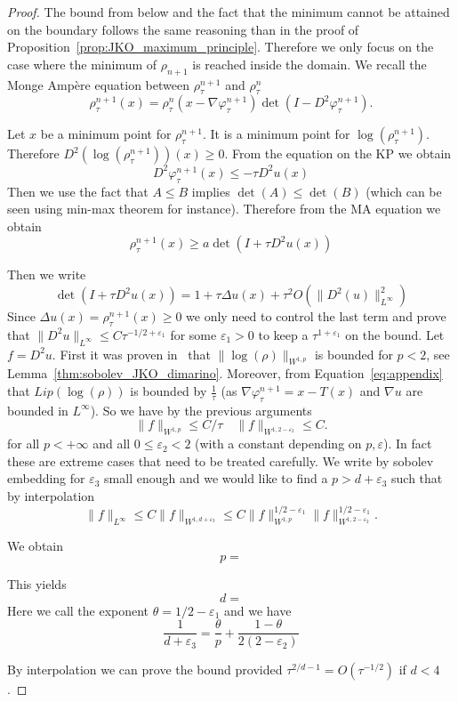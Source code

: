 \documentclass[a4paper,twosided, 11pt]{article}
\newcommand{\eps}{\varepsilon}
\newcommand {\f}   {\frac}
\theoremstyle{plain}
\theoremstyle{remark}
\numberwithin{equation}{section}
\begin{document}
\begin{proof}
The bound from below and the fact that the minimum cannot be attained on the boundary follows the same reasoning than in the proof of Proposition~\ref{prop:JKO_maximum_principle}. Therefore we only focus on the case where the minimum of $\rho_{n+1}$ is reached inside the domain. We recall the Monge Ampère equation between $\rho^{n+1}_{\tau}$ and $\rho^{n}_{\tau}$
$$
\rho^{n+1}_{\tau} (x) = \rho^{n}_{\tau}(x-\nabla\varphi^{n+1}_{\tau})\det(I- D^2\varphi^{n+1}_{\tau}).
$$


Let $x$ be a minimum point for $\rho^{n+1}_{\tau}$. It is a minimum point for $\log(\rho^{n+1}_{\tau})$. Therefore $D^2(\log(\rho^{n+1}_{\tau}))(x)\ge 0$. From the equation on the KP we obtain 
$$
D^2\varphi^{n+1}_{\tau}(x)\le -\tau D^2 u(x)
$$
Then we use the fact that $A\le B$ implies $\det(A)\le \det(B)$ (which can be seen using min-max theorem for instance). Therefore from the MA equation we obtain
$$
\rho^{n+1}_{\tau}(x)\ge a \det(I + \tau D^2u(x))
$$

Then we write 
$$
\det(I + \tau D^2u(x)) = 1 + \tau \Delta u(x) + \tau^2 O(\|D^2(u)\|_{L^{\infty}}^2)
$$
Since $\Delta u(x)=\rho^{n+1}_{\tau}(x)\ge 0$ we only need to control the last term and prove that $\|D^2 u\|_{L^{\infty}}\le C\tau^{-1/2+\eps_{1}}$ for some $\eps_1>0$ to keep a $\tau^{1+\eps_1}$ on the bound. Let $f=D^2 u$. First it was proven in~\cite{dimarino} that $\|\log(\rho)\|_{W^{1,p}}$ is bounded for $p<2$, see Lemma~\ref{thm:sobolev_JKO_dimarino}. Moreover, from Equation~\eqref{eq:appendix} that $Lip(\log(\rho))$ is bounded by  $\f{1}{\tau}$ (as $\nabla\varphi^{n+1}_{\tau} = x-T(x)$ and $\nabla u$ are bounded in $L^{\infty}$). 
So we have by the previous arguments 
$$
\|f\|_{W^{1,p}}\le C/\tau \quad \|f\|_{W^{1,2-\eps_2}}\le C.
$$
for all $p<+\infty$ and all $0\le\eps_2<2$ (with a constant depending on $p,\eps$).
In fact these are extreme cases that need to be treated carefully.
We write by sobolev embedding for $\eps_3$ small enough and we would like to find a $p>d+\eps_3$ such that by interpolation
$$
\|f\|_{L^{\infty}}\le C \|f\|_{W^{1,d+\eps_3}}\le C \|f\|_{W^{1,p}}^{1/2-\eps_1}\|f\|^{1/2-\eps_1}_{W^{1,2-\eps_2}}.
$$

We obtain 
$$
p = 
$$

This yields
$$
d=
$$
Here we call the exponent $\theta=1/2 - \eps_1$ and we have 
$$
\f{1}{d+\eps_3} = \f{\theta}{p} + \f{1-\theta}{2(2-\eps_2)}
$$




By interpolation we can prove the bound provided $\tau^{2/d -1}= O(\tau^{-1/2})$ if $d<4$. 

\end{proof}

\fi




\end{document}

